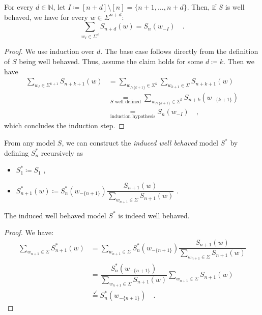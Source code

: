\documentclass[../../main.tex]{subfiles}
\begin{document}
    \begin{lemma}
        For every $d \in \mathbb{N}$, let $I \coloneqq [n + d] \setminus [n] = \{ n+1, \dots, n + d \}$. Then, if $S$ is well behaved, we have for every $w \in \Sigma^{n + d}$:
        \[
            \sum_{w_I \in \Sigma^d} S_{n + d}(w) = S_n(w_{-I}) \quad .
        \]
    \end{lemma}
    \begin{proof}
        We use induction over $d$. The base case follows directly from the definition of $S$ being well behaved. Thus, assume the claim holds for some $d \coloneqq k$. Then we have
        \begin{align*}
            \sum_{w_I \in \Sigma^{k + 1}} S_{n + k + 1}(w) &= \sum_{w_{I \setminus \{ k + 1 \}} \in \Sigma^{k}} \sum_{w_{k + 1} \in \Sigma} S_{n + k + 1}(w) \\
            &\underset{S \text{ well defined}}{=} \sum_{w_{I \setminus \{ k + 1 \}} \in \Sigma^{k}} S_{n + k}(w_{-\{ k + 1 \}}) \\
            &\underset{\text{induction hypothesis}}{=} S_n(w_{-I}) \quad ,
        \end{align*}
        which concludes the induction step.
    \end{proof}

    \begin{definition}
        From any model $S$, we can construct the \emph{induced well behaved} model $S^*$ by defining $S_n^*$ recursively as 
        \begin{itemize}
            \item $S_1^* \coloneqq S_1$ ,
            \item $S_{n + 1}^*(w) \coloneqq S_n^*(w_{-\{n+1\}}) \dfrac{S_{n+1}(w)}{\sum_{w_{n+1} \in \Sigma} S_{n+1}(w)}$ .
        \end{itemize}
    \end{definition}

    \begin{lemma}
        The induced well behaved model $S^*$ is indeed well behaved.
    \end{lemma}
    \vspace{-2.5em}
    \begin{proof}
        We have:
        \begin{align*}
            \sum_{w_{n + 1} \in \Sigma} S_{n + 1}^*(w) &= \sum_{w_{n + 1} \in \Sigma} S_n^*(w_{-\{n+1\}}) \dfrac{S_{n+1}(w)}{\sum_{w_{n+1} \in \Sigma} S_{n+1}(w)} \\
            &= \dfrac{S_n^*(w_{-\{n+1\}})}{\sum_{w_{n+1} \in \Sigma} S_{n+1}(w)} \sum_{w_{n + 1} \in \Sigma} S_{n+1}(w) \\
            &\overset{\checkmark}{=} S_n^*(w_{-\{n+1\}}) \quad .
        \end{align*}
    \end{proof}
\end{document}
